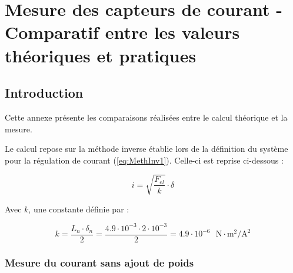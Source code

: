 \chapter{Mesure des capteurs de courant - Comparatif entre les valeurs théoriques et pratiques}
\label{annexe:MesCour}

\section{Introduction}
Cette annexe présente les comparaisons réalisées entre le calcul théorique et la mesure.

Le calcul repose sur la méthode inverse établie lors de la définition du système pour la régulation de courant (\autoref{eq:MethInv1}). Celle-ci est reprise ci-dessous :

\begin{equation}
    i = \sqrt{\frac{F_{el}}{k}} \cdot \delta
\end{equation}

Avec $k$, une constante définie par :

\begin{equation}
    k = \frac{L_n\cdot\delta_n}{2} = \frac{4.9\cdot 10^{-3}\cdot 2\cdot 10^{-3}}{2}=4.9\cdot 10^{-6} \text{ } \text{N}\cdot\text{m}^2/\text{A}^2
\end{equation}

\subsection{Mesure du courant sans ajout de poids}

